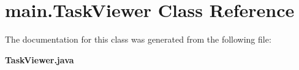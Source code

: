\section{main.\+Task\+Viewer Class Reference}
\label{classmain_1_1_task_viewer}


The documentation for this class was generated from the following file\+:\begin{DoxyCompactItemize}
\item 
\textbf{ Task\+Viewer.\+java}\end{DoxyCompactItemize}
